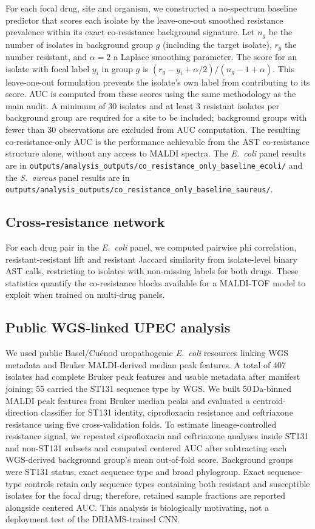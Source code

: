 \documentclass[11pt]{article}
\begin{document}
For each focal drug, site and organism, we constructed a no-spectrum baseline predictor that scores each isolate by the leave-one-out smoothed resistance prevalence within its exact co-resistance background signature. Let $n_g$ be the number of isolates in background group $g$ (including the target isolate), $r_g$ the number resistant, and $\alpha = 2$ a Laplace smoothing parameter. The score for an isolate with focal label $y_i$ in group $g$ is $(r_g - y_i + \alpha/2) / (n_g - 1 + \alpha)$. This leave-one-out formulation prevents the isolate's own label from contributing to its score. AUC is computed from these scores using the same methodology as the main audit. A minimum of 30 isolates and at least 3 resistant isolates per background group are required for a site to be included; background groups with fewer than 30 observations are excluded from AUC computation. The resulting co-resistance-only AUC is the performance achievable from the AST co-resistance structure alone, without any access to MALDI spectra. The \textit{E.~coli} panel results are in \texttt{outputs/analysis\_outputs/co\_resistance\_only\_baseline\_ecoli/} and the \textit{S.~aureus} panel results are in \texttt{outputs/analysis\_outputs/co\_resistance\_only\_baseline\_saureus/}.

\subsection*{Cross-resistance network}

For each drug pair in the \textit{E.~coli} panel, we computed pairwise phi correlation, resistant-resistant lift and resistant Jaccard similarity from isolate-level binary AST calls, restricting to isolates with non-missing labels for both drugs. These statistics quantify the co-resistance blocks available for a MALDI-TOF model to exploit when trained on multi-drug panels.

\subsection*{Public WGS-linked UPEC analysis}

We used public Basel/Cu\'{e}nod uropathogenic \textit{E.~coli} resources linking WGS metadata and Bruker MALDI-derived median peak features\cite{cuenod2023papgii}. A total of 407 isolates had complete Bruker peak features and usable metadata after manifest joining; 55 carried the ST131 sequence type by WGS. We built 50\,Da-binned MALDI peak features from Bruker median peaks and evaluated a centroid-direction classifier for ST131 identity, ciprofloxacin resistance and ceftriaxone resistance using five cross-validation folds. To estimate lineage-controlled resistance signal, we repeated ciprofloxacin and ceftriaxone analyses inside ST131 and non-ST131 subsets and computed centered AUC after subtracting each WGS-derived background group's mean out-of-fold score. Background groups were ST131 status, exact sequence type and broad phylogroup. Exact sequence-type controls retain only sequence types containing both resistant and susceptible isolates for the focal drug; therefore, retained sample fractions are reported alongside centered AUC. This analysis is biologically motivating, not a deployment test of the DRIAMS-trained CNN.
\end{document}
